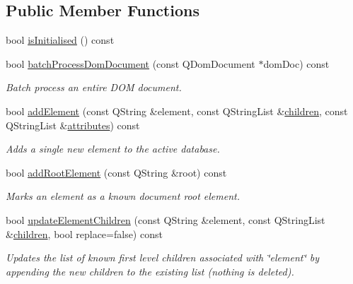\subsection*{\-Public \-Member \-Functions}
\begin{DoxyCompactItemize}
\item 
bool \hyperlink{class_g_c_data_base_interface_a2d20cd6ae4f1ba007fdc1367611b97e0}{is\-Initialised} () const 
\item 
bool \hyperlink{class_g_c_data_base_interface_a2c20ff88464664aef988c9c0417e19be}{batch\-Process\-Dom\-Document} (const \-Q\-Dom\-Document $\ast$dom\-Doc) const 
\begin{DoxyCompactList}\small\item\em \-Batch process an entire \-D\-O\-M document. \end{DoxyCompactList}\item 
bool \hyperlink{class_g_c_data_base_interface_a650cbb413d65c7b2f76fb4c8621295f7}{add\-Element} (const \-Q\-String \&element, const \-Q\-String\-List \&\hyperlink{class_g_c_data_base_interface_aab5126783bc3acc7c718c8ffd8af62bc}{children}, const \-Q\-String\-List \&\hyperlink{class_g_c_data_base_interface_afb1e49e08f98ca453f9ac66340a35642}{attributes}) const 
\begin{DoxyCompactList}\small\item\em \-Adds a single new element to the active database. \end{DoxyCompactList}\item 
bool \hyperlink{class_g_c_data_base_interface_a83ecf5fa6efc6650c834274e0e3b3aa5}{add\-Root\-Element} (const \-Q\-String \&root) const 
\begin{DoxyCompactList}\small\item\em \-Marks an element as a known document root element. \end{DoxyCompactList}\item 
bool \hyperlink{class_g_c_data_base_interface_a91a60134bfb21a3f49d826340bebb852}{update\-Element\-Children} (const \-Q\-String \&element, const \-Q\-String\-List \&\hyperlink{class_g_c_data_base_interface_aab5126783bc3acc7c718c8ffd8af62bc}{children}, bool replace=false) const 
\begin{DoxyCompactList}\small\item\em \-Updates the list of known first level children associated with \char`\"{}element\char`\"{} by appending the new children to the existing list (nothing is deleted). \end{DoxyCompactList}\item 

\end{DoxyCompactItemize}
